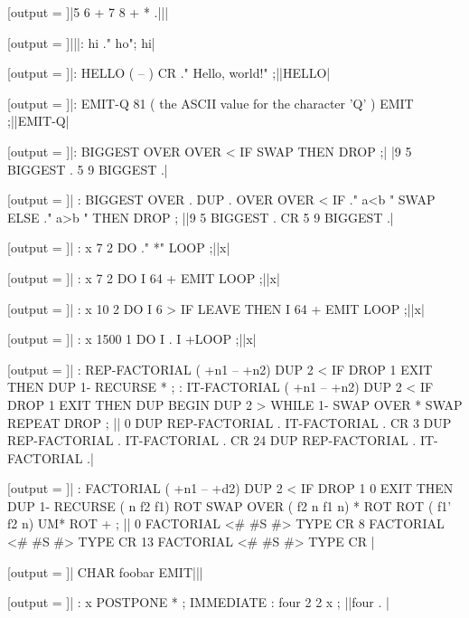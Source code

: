 \RequirePackage{runner}
\newcommand{\result}{}

[output = \result]|5 6 + 7 8 + * .|||
\typeout{\result}

[output = \result]|||: hi ." ho"; hi|
\typeout{\result}

[output = \result]|: HELLO  ( -- )  CR ." Hello, world!" ;||HELLO|
\typeout{\result}

[output = \result]|: EMIT-Q   81 ( the ASCII value for the character 'Q' ) EMIT ;||EMIT-Q|
\typeout{\result}

[output = \result]|: BIGGEST OVER OVER < IF SWAP THEN DROP ;|%
|9 5 BIGGEST . 5 9 BIGGEST .|
\typeout{\result}

[output = \result]|
  : BIGGEST OVER . DUP .
    OVER OVER < IF
      ." a<b " SWAP
    ELSE
      ." a>b "
    THEN
    DROP ;
||9 5 BIGGEST . CR 5 9 BIGGEST .|
\typeout{\result}

[output = \result]|
  : x 7 2 DO ." *" LOOP ;||x|
\typeout{\result}

[output = \result]|
  : x 7 2 DO I 64 + EMIT LOOP ;||x|
\typeout{\result}

[output = \result]|
  : x 10 2 DO I 6 > IF LEAVE THEN I 64 + EMIT LOOP ;||x|
\typeout{\result}

[output = \result]|
  : x 1500 1 DO I . I +LOOP ;||x|
\typeout{\result}

[output = \result]|
  : REP-FACTORIAL ( +n1 -- +n2)
  DUP 2 < IF DROP 1 EXIT THEN
  DUP 1- RECURSE *
  ;
  : IT-FACTORIAL ( +n1 -- +n2)
  DUP 2 < IF DROP 1 EXIT THEN
  DUP
  BEGIN DUP 2 > WHILE
  1- SWAP OVER * SWAP
  REPEAT DROP
  ;
||
0 DUP REP-FACTORIAL . IT-FACTORIAL . CR
3 DUP REP-FACTORIAL . IT-FACTORIAL . CR
24 DUP REP-FACTORIAL . IT-FACTORIAL .|
\typeout{\result}

[output = \result]|
  : FACTORIAL ( +n1 -- +d2)
  DUP 2 < IF DROP 1 0 EXIT THEN
  DUP 1- RECURSE ( n f2 f1)
  ROT SWAP OVER ( f2 n f1 n)
  * ROT ROT ( f1' f2 n)
  UM* ROT +
  ;
||
0 FACTORIAL <# #S #> TYPE CR
8 FACTORIAL <# #S #> TYPE CR
13 FACTORIAL <# #S #> TYPE CR
|
\typeout{\result}

[output = \result]|
  CHAR foobar EMIT|||
\typeout{\result}

[output = \result]|
  : x POSTPONE * ; IMMEDIATE :
  four 2 2 x ;
||four . |
\typeout{\result}

